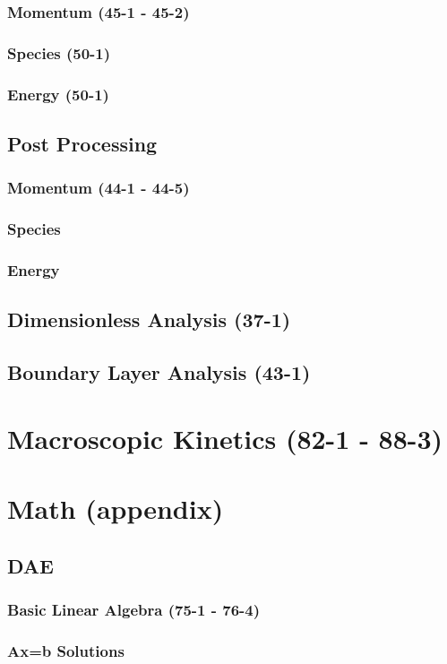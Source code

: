 \documentclass{mitqualif}
\begin{document}
\subsection{Momentum (45-1 - 45-2)}
\subsection{Species (50-1)}
\subsection{Energy (50-1)}
\section{Post Processing}
\subsection{Momentum (44-1 - 44-5)}
\subsection{Species}
\subsection{Energy}
\section{Dimensionless Analysis (37-1)}

\section{Boundary Layer Analysis (43-1)}
\newpage
\chapter{Macroscopic Kinetics (82-1 - 88-3)}
\newpage
\chapter{Math (appendix)}
\section{DAE}
\subsection{Basic Linear Algebra (75-1 - 76-4)}
\subsection{Ax=b Solutions}
\end{document}
